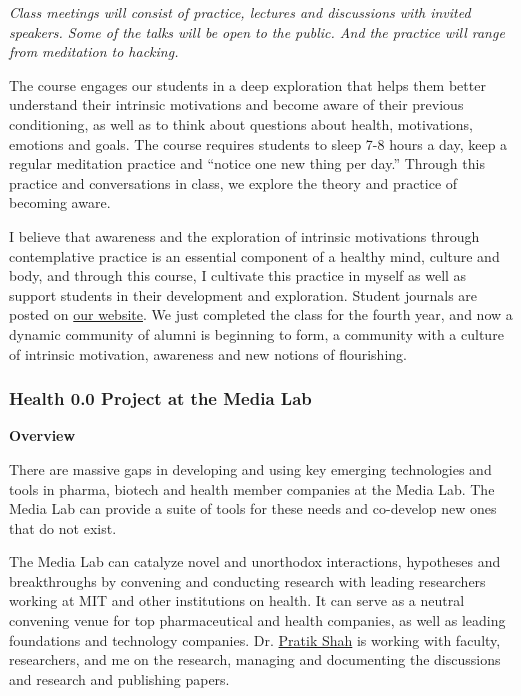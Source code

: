 \textit{Class meetings will consist of practice, lectures and discussions with invited speakers. Some of the talks will be open to the public. And the practice will range from meditation to hacking.}

The course engages our students in a deep exploration that helps them better understand their intrinsic motivations and become aware of their previous conditioning, as well as to think about questions about health, motivations, emotions and goals. The course requires students to sleep 7-8 hours a day, keep a regular meditation practice and ``notice one new thing per day.'' Through this practice and conversations in class, we explore the theory and practice of becoming aware.

I believe that awareness and the exploration of intrinsic motivations through contemplative practice is an essential component of a healthy mind, culture and body, and through this course, I cultivate this practice in myself as well as support students in their development and exploration. Student journals are posted on \href{https://awareness.pubpub.org/}{our website}. We just completed the class for the fourth year, and now a dynamic community of alumni is beginning to form, a community with a culture of intrinsic motivation, awareness and new notions of flourishing.

\subsubsection{Health 0.0 Project at the Media Lab}
\label{sec:health00}

\textbf{Overview}

There are massive gaps in developing and using key emerging technologies and tools in pharma, biotech and health member companies at the Media Lab. The Media Lab can provide a suite of tools for these needs and co-develop new ones that do not exist.

The Media Lab can catalyze novel and unorthodox interactions, hypotheses and breakthroughs by convening and conducting research with leading researchers working at MIT and other institutions on health. It can serve as a neutral convening venue for top pharmaceutical and health companies, as well as leading foundations and technology companies. Dr. \href{https://www.pratiks.info/}{Pratik Shah} is working with faculty, researchers, and me on the research, managing and documenting the discussions and research and publishing papers.

